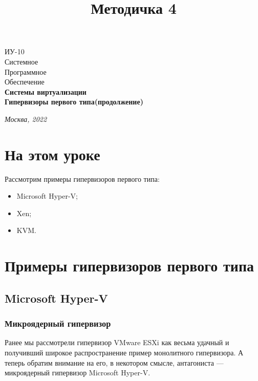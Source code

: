 \documentclass[14pt, a4paper]{article}
\title{Методичка 4}
\begin{document}
\begin{titlepage}
    \topmargin=216pt
    \newpage
    \hangindent=0.7cm
    \huge ИУ-10\\
    Системное\\
    Программное\\
    Обеспечение\\
    \textbf{Системы виртуализации\\ Гипервизоры первого типа(продолжение)}

    \vspace{10cm}

    \begin{center}
        \small\textit{Москва, 2022}
    \end{center}
\end{titlepage}
\section*{На этом уроке}
Рассмотрим примеры гипервизоров первого типа:
\begin{itemize}
    \item Microsoft Hyper-V;
    \item Xen;
    \item KVM.
\end{itemize}
\tableofcontents
\newpage

\section*{Примеры гипервизоров первого типа}

\subsection*{Microsoft Hyper-V}


\subsubsection*{Микроядерный гипервизор}

Ранее мы рассмотрели гипервизор VMware ESXi как весьма удачный и получивший широкое
распространение пример монолитного гипервизора. А теперь обратим внимание на его, в некотором
смысле, антагониста — микроядерный гипервизор Microsoft Hyper-V.
\end{document}
